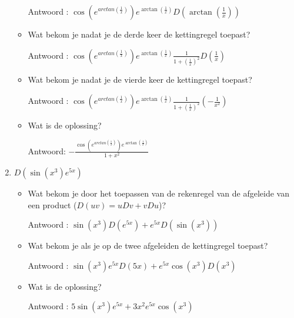 \begin{enumerate}
\begin{itemize}
		Antwoord : $\cos \left(  e^{arctan \left(  \frac{1}{x}  \right) } \right) e^{\arctan \left(  \frac{1}{x}  \right) }D \left( \arctan \left(  \frac{1}{x}  \right)  \right)$
		
		\item Wat bekom je nadat je de derde keer de kettingregel toepast?
		
		Antwoord : $\cos \left(  e^{arctan \left(  \frac{1}{x}  \right) } \right) e^{\arctan \left(  \frac{1}{x}  \right) }\frac{1}{1+\left( \frac{1}{x}  \right)^2}D\left( \frac{1}{x}  \right)$
		
		\item Wat bekom je nadat je de vierde keer de kettingregel toepast?
		
		Antwoord :  $\cos \left(  e^{arctan \left(  \frac{1}{x}  \right) } \right) e^{\arctan \left(  \frac{1}{x}  \right) }\frac{1}{1+\left( \frac{1}{x}  \right)^2}\left( -\frac{1}{x^2}  \right)$
		
		\item Wat is de oplossing?
		
		Antwoord: $-\frac{ \cos \left(  e^{arctan \left(  \frac{1}{x}  \right) } \right)  e^{\arctan \left(  \frac{1}{x}  \right) }  }{ 1+x^2  }$
		
	\end{itemize}
	
	\item $D \left(  \sin \left( x^3  \right) e^{5x}  \right)$
	
	\begin{itemize}
		
		\item Wat bekom je door het toepassen van de rekenregel van de afgeleide van een product ($D(uv)=uDv+vDu$)?
		
		Antwoord : $\sin \left( x^3  \right)D\left( e^{5x}  \right)+e^{5x}D\left(  \sin \left(  x^3 \right)  \right)$
		
		\item Wat bekom je als je op de twee afgeleiden de kettingregel toepast?
		
		Antwoord : $\sin \left( x^3  \right)e^{5x}D(5x)+e^{5x}\cos \left(  x^3 \right)D \left( x^3 \right)$
		
		\item Wat is de oplossing?
		
		Antwoord : $5\sin \left( x^3  \right)e^{5x}+3x^2e^{5x}\cos \left(  x^3 \right)$
		
	\end{itemize}
	

\end{enumerate}
